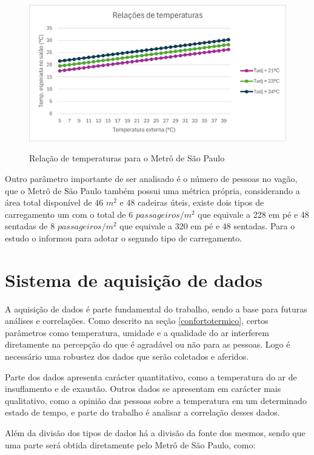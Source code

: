 \documentclass[acronym,symbols,table]{fei}
\begin{document}
\begin{figure}[!htb]
\centering
    \caption{Relação de temperaturas para o Metrô de São Paulo}
    \includegraphics[width=0.8\linewidth]{Imagens/Relacoes_de_temperaturas.png}
    \label{fig:temperatura_metro}
\end{figure}

Outro parâmetro importante de ser analisado é o número de pessoas no vagão, que o Metrô de São Paulo também possui uma métrica própria, considerando a área total disponível de 46 $m^2$ e 48 cadeiras úteis, existe dois tipos de carregamento um com o total de ${6}$ $passageiros/m^2$ que equivale a 228 em pé e 48 sentadas de ${8}$ $passageiros/m^2$ que equivale a 320 em pé e 48 sentadas. Para o estudo o \textcite{metrosp2024} informou para adotar o segundo tipo de carregamento.  

\section{Sistema de aquisição de dados}

A aquisição de dados é parte fundamental do trabalho, sendo a base para futuras análises e correlações. Como descrito na seção \ref{confortotermico}, certos parâmetros como temperatura, umidade e a qualidade do ar interferem diretamente na percepção do que é agradável ou não para as pessoas. Logo é necessário uma robustez dos dados que serão coletados e aferidos.

Parte dos dados apresenta carácter quantitativo, como a temperatura do ar de insuflamento e de exaustão. Outros dados se apresentam em carácter mais qualitativo, como a opinião das pessoas sobre a temperatura em um determinado estado de tempo, e parte do trabalho é analisar a correlação desses dados.

Além da divisão dos tipos de dados há a divisão da fonte dos mesmos, sendo que uma parte será obtida diretamente pelo Metrô de São Paulo, como:
\end{document}
